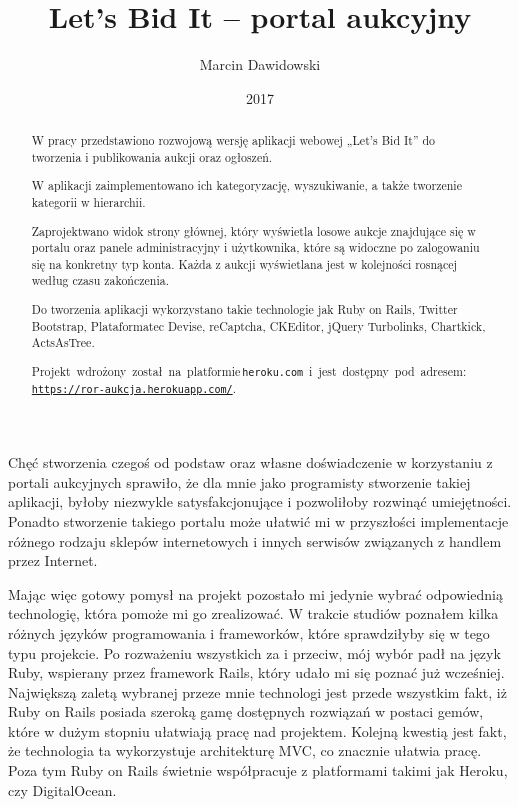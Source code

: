 \documentclass[brudnopis]{xmgr}
\author   {Marcin Dawidowski}
\title    {Let’s Bid It – portal aukcyjny}
\date     {2017}
\begin{document}
\begin{abstract}
  W pracy przedstawiono rozwojową wersję aplikacji webowej „Let's Bid It” do tworzenia i publikowania aukcji oraz ogłoszeń.
  
  W aplikacji zaimplementowano ich kategoryzację, wyszukiwanie, a także tworzenie kategorii w hierarchii.

  Zaprojektwano widok strony głównej, który wyświetla losowe aukcje znajdujące się w portalu oraz panele administracyjny i użytkownika, które są widoczne po zalogowaniu się na konkretny typ konta. Każda z aukcji wyświetlana jest w kolejności rosnącej według czasu zakończenia.

  Do tworzenia aplikacji wykorzystano takie technologie jak Ruby on Rails, Twitter Bootstrap, Plataformatec Devise, reCaptcha, CKEditor, jQuery Turbolinks, Chartkick, ActsAsTree.

\mbox{Projekt wdrożony został na platformie\, \\\texttt{heroku.com} i jest dostępny pod adresem:} \\\texttt{\url{https://ror-aukcja.herokuapp.com/}}.


\end{abstract}


\maketitle

\introduction

Chęć stworzenia czegoś od podstaw oraz własne doświadczenie w korzystaniu z portali aukcyjnych sprawiło, że dla mnie jako programisty stworzenie takiej aplikacji, byłoby niezwykle satysfakcjonujące i pozwoliłoby rozwinąć umiejętności. Ponadto stworzenie takiego portalu może ułatwić mi w przyszłości implementacje różnego rodzaju sklepów internetowych i innych serwisów związanych z handlem przez Internet.

Mając więc gotowy pomysł na projekt pozostało mi jedynie wybrać odpowiednią technologię, która pomoże mi go zrealizować. W trakcie studiów poznałem kilka różnych języków programowania i frameworków, które sprawdziłyby się w tego typu projekcie. Po rozważeniu wszystkich za i przeciw, mój wybór padł na język Ruby, wspierany przez framework Rails, który udało mi się poznać już wcześniej. Największą zaletą wybranej przeze mnie technologi jest przede wszystkim fakt, iż Ruby on Rails posiada szeroką gamę dostępnych rozwiązań w postaci gemów, które w dużym stopniu ułatwiają pracę nad projektem. Kolejną kwestią jest fakt, że technologia  ta wykorzystuje architekturę MVC, co znacznie ułatwia pracę. Poza tym Ruby on Rails świetnie współpracuje z platformami takimi jak Heroku, czy DigitalOcean. 
\end{document}
